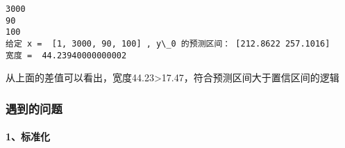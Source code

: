 \documentclass[11pt]{article}
\begin{document}
    \begin{Verbatim}[commandchars=\\\{\}]
3000
90
100
给定 x =  [1, 3000, 90, 100] , y\_0 的预测区间： [212.8622 257.1016]
宽度 =  44.23940000000002
    \end{Verbatim}

    从上面的差值可以看出，宽度44.23\textgreater17.47，符合预测区间大于置信区间的逻辑

    \hypertarget{ux9047ux5230ux7684ux95eeux9898}{%
\subsubsection{遇到的问题}\label{ux9047ux5230ux7684ux95eeux9898}}

    \hypertarget{ux6807ux51c6ux5316}{%
\paragraph{1、标准化}\label{ux6807ux51c6ux5316}}
\end{document}
